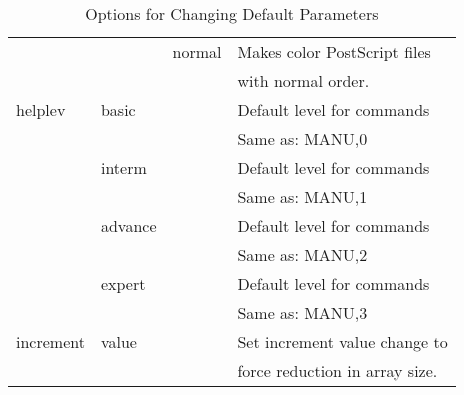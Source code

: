 \begin{table}
\begin{center}
\begin{tabular}{l l l |  l}
        &       & normal  & Makes color PostScript files \\
 & & & with normal order. \\ \hline
helplev & basic & & Default level for commands \\
 & & & Same as: MANU,0 \\
        & interm & & Default level for commands \\
 & & & Same as: MANU,1 \\
        & advance & & Default level for commands \\
 & & & Same as: MANU,2 \\
        & expert & & Default level for commands \\
 & & & Same as: MANU,3 \\
increment & value & & Set increment value change to \\
 & & & force reduction in array size. \\
\end{tabular}
\caption{Options for Changing Default Parameters}
\label{tab22}
\end{center}
\end{table}
